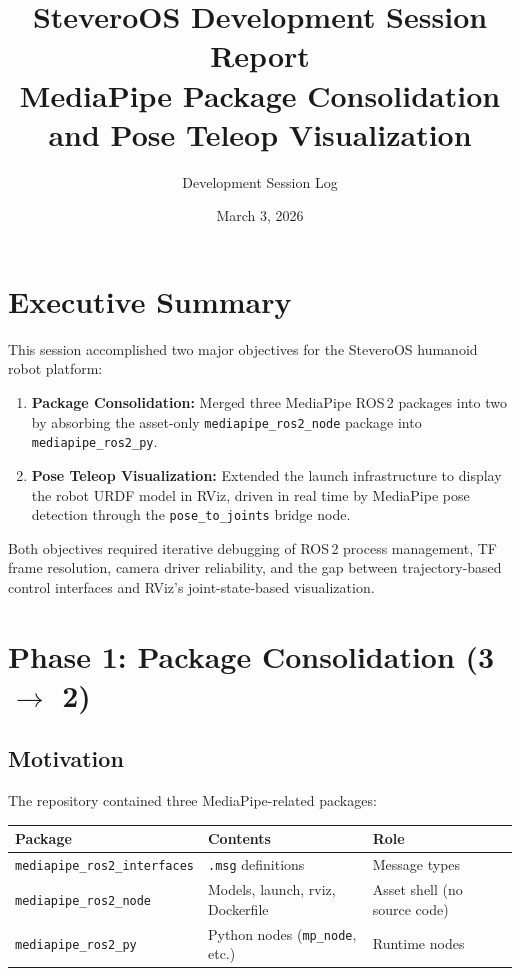 \documentclass[11pt,a4paper]{article}
\title{%
  \textbf{SteveroOS Development Session Report} \\[0.5em]
  \large MediaPipe Package Consolidation and Pose Teleop Visualization
}
\author{Development Session Log}
\date{March 3, 2026}
\begin{document}
\maketitle
\tableofcontents
\newpage

\section{Executive Summary}

This session accomplished two major objectives for the SteveroOS humanoid robot platform:

\begin{enumerate}
    \item \textbf{Package Consolidation:} Merged three MediaPipe ROS\,2 packages into two by absorbing the asset-only \texttt{mediapipe\_ros2\_node} package into \texttt{mediapipe\_ros2\_py}.
    \item \textbf{Pose Teleop Visualization:} Extended the launch infrastructure to display the robot URDF model in RViz, driven in real time by MediaPipe pose detection through the \texttt{pose\_to\_joints} bridge node.
\end{enumerate}

Both objectives required iterative debugging of ROS\,2 process management, TF frame resolution, camera driver reliability, and the gap between trajectory-based control interfaces and RViz's joint-state-based visualization.

\section{Phase 1: Package Consolidation (3 $\rightarrow$ 2)}

\subsection{Motivation}

The repository contained three MediaPipe-related packages:

\begin{center}
\begin{tabular}{lll}
\toprule
\textbf{Package} & \textbf{Contents} & \textbf{Role} \\
\midrule
\texttt{mediapipe\_ros2\_interfaces} & \texttt{.msg} definitions & Message types \\
\texttt{mediapipe\_ros2\_node} & Models, launch, rviz, Dockerfile & Asset shell (no source code) \\
\texttt{mediapipe\_ros2\_py} & Python nodes (\texttt{mp\_node}, etc.) & Runtime nodes \\
\bottomrule
\end{tabular}
\end{center}
\end{document}
